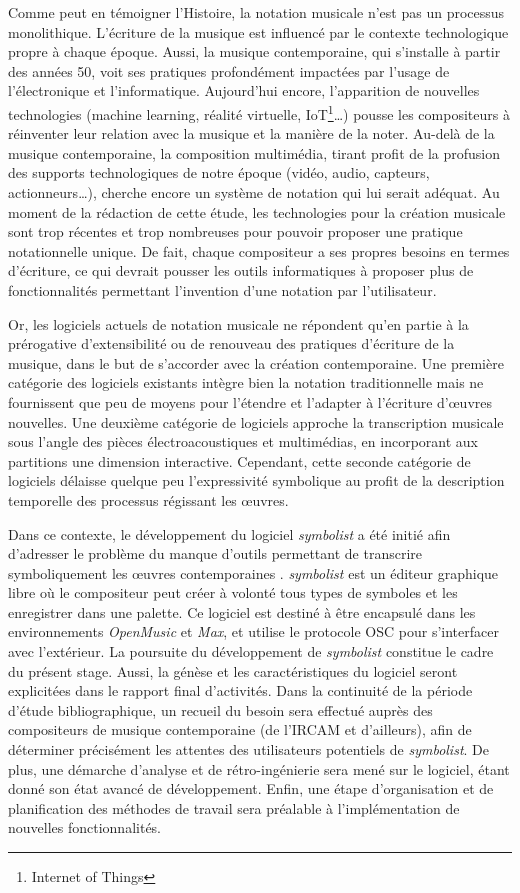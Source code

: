 Comme peut en témoigner l'Histoire, la notation musicale n'est pas un processus monolithique. L'écriture de la musique est influencé par le contexte technologique propre à chaque époque. Aussi, la musique contemporaine, qui s'installe à partir des années 50, voit ses pratiques profondément impactées par l'usage de l'électronique et l'informatique. Aujourd'hui encore, l'apparition de nouvelles technologies (machine learning, réalité virtuelle, IoT\footnote{Internet of Things}…) pousse les compositeurs à réinventer leur relation avec la musique et la manière de la noter. Au-delà de la musique contemporaine, la composition multimédia, tirant profit de la profusion des supports technologiques de notre époque (vidéo, audio, capteurs, actionneurs…), cherche encore un système de notation qui lui serait adéquat. Au moment de la rédaction de cette étude, les technologies pour la création musicale sont trop récentes et trop nombreuses pour pouvoir proposer une pratique notationnelle unique. De fait, chaque compositeur a ses propres besoins en termes d'écriture, ce qui devrait pousser les outils informatiques à proposer plus de fonctionnalités permettant l'invention d'une notation par l'utilisateur.

Or, les logiciels actuels de notation musicale ne répondent qu'en partie à la prérogative d'extensibilité ou de renouveau des pratiques d'écriture de la musique, dans le but de s'accorder avec la création contemporaine. Une première catégorie des logiciels existants intègre bien la notation traditionnelle mais ne fournissent que peu de moyens pour l'étendre et l'adapter à l'écriture d'œuvres nouvelles. Une deuxième catégorie de logiciels approche la transcription musicale sous l'angle des pièces électroacoustiques et multimédias, en incorporant aux partitions une dimension interactive. Cependant, cette seconde catégorie de logiciels délaisse quelque peu l'expressivité symbolique au profit de la description temporelle des processus régissant les œuvres.

Dans ce contexte, le développement du logiciel \textit{symbolist} a été initié afin d'adresser le problème du manque d'outils permettant de transcrire symboliquement les œuvres contemporaines \cite{gottfried2018}.
\textit{symbolist} est un éditeur graphique libre où le compositeur peut créer à volonté tous types de symboles et les enregistrer dans une palette. Ce logiciel est destiné à être encapsulé dans les environnements \textit{OpenMusic} et \textit{Max}, et utilise le protocole OSC pour s'interfacer avec l'extérieur.
La poursuite du développement de \textit{symbolist} constitue le cadre du présent stage. Aussi, la génèse et les caractéristiques du logiciel seront explicitées dans le rapport final d'activités.
Dans la continuité de la période d'étude bibliographique, un recueil du besoin sera effectué auprès des compositeurs de musique contemporaine (de l'IRCAM et d'ailleurs), afin de déterminer précisément les attentes des utilisateurs potentiels de \textit{symbolist}.
De plus, une démarche d'analyse et de rétro-ingénierie sera mené sur le logiciel, étant donné son état avancé de développement.
Enfin, une étape d'organisation et de planification des méthodes de travail sera préalable à l'implémentation de nouvelles fonctionnalités.   
 